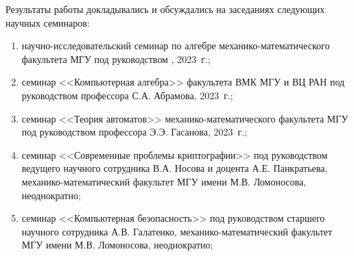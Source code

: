Результаты работы докладывались и обсуждались на заседаниях следующих научных семинаров:
\begin{enumerate}
    \item научно-исследовательский семинар по алгебре механико-математического факультета МГУ под руководством , 2023~г.;

    \item семинар <<Компьютерная алгебра>> факультета ВМК МГУ и ВЦ РАН под руководством профессора С.А. Абрамова, 2023~г.;

    \item семинар <<Теория автоматов>> механико-математического факультета МГУ под руководством профессора Э.Э. Гасанова, 2023~г.;

    \item семинар <<Современные проблемы криптографии>> под руководством ведущего научного сотрудника В.А. Носова и доцента А.Е. Панкратьева, механико-математический факультет МГУ имени М.В. Ломоносова, неоднократно;

    \item семинар <<Компьютерная безопасность>> под руководством старшего научного сотрудника А.В. Галатенко, механико-математический факультет МГУ имени М.В. Ломоносова, неоднократно;
\end{enumerate}


